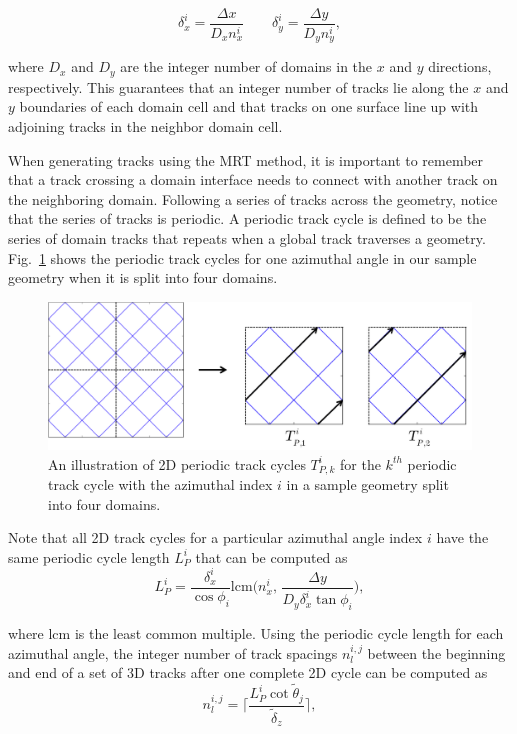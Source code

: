 \begin{equation}
\delta_x^i = \frac{\Delta x}{D_x n_x^i} \qquad \delta_y^i = \frac{\Delta y}{D_y n_y^i},
\label{eq:mrt-dx-dy}
\end{equation}

\noindent
where $D_x$ and $D_y$ are the integer number of domains in the $x$ and $y$ directions, respectively. This guarantees that an integer number of tracks lie along the $x$ and $y$ boundaries of each domain cell and that tracks on one surface line up with adjoining tracks in the neighbor domain cell. 

When generating tracks using the \ac{MRT} method, it is important to remember that a track crossing a domain interface needs to connect with another track on the neighboring domain. Following a series of tracks across the geometry, notice that the series of tracks is periodic. A periodic track cycle is defined to be the series of domain tracks that repeats when a global track traverses a geometry. Fig.~\ref{fig:periodic-cycles} shows the periodic track cycles for one azimuthal angle in our sample geometry when it is split into four domains.

\begin{figure}[h]
	\centering
	\includegraphics[width=5in]{figures/laydown/2d_periodic_track_cycles_2.png}
	\caption{An illustration of 2D periodic track cycles $T_{P,k}^i$ for the $k^{th}$ periodic track cycle with the azimuthal index $i$ in a sample geometry split into four domains.}
	\label{fig:periodic-cycles}
\end{figure}
Note that all 2D track cycles for a particular azimuthal angle index $i$ have the same periodic cycle length $L_P^{i}$ that can be computed as
\begin{equation}
L_P^i = \frac{\delta_x^i}{\cos{\phi_i}}  \text{lcm} \bigg( n_x^i, \,  \frac{\Delta y}{D_y \delta_x^i \tan{\phi_i}} \bigg),
\label{eq:period-cycle-len}
\end{equation}

\noindent
where lcm is the least common multiple. Using the periodic cycle length for each azimuthal angle, the integer number of track spacings $n_l^{i,j}$ between the beginning and end of a set of 3D tracks after one complete 2D cycle can be computed as
\begin{equation}
n_l^{i,j} = \Bigg\lceil \frac{L_P^i \cot{\tilde{\theta}_{j}}}{\tilde{\delta}_z} \Bigg\rceil,
\label{eq:MRT-nl}
\end{equation}

